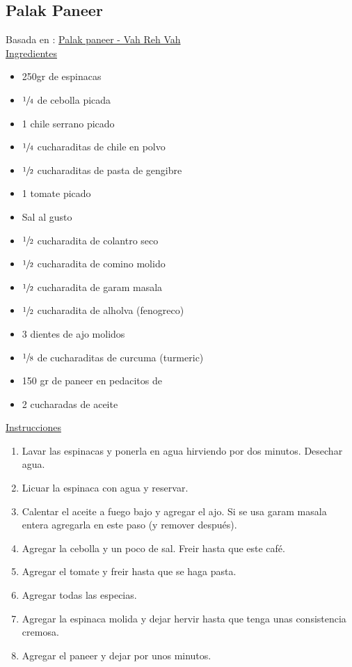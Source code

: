 \subsection{Palak Paneer}

Basada en : \href{https://www.vahrehvah.com/palak-paneer}{Palak paneer - Vah Reh Vah} \\

\underline{Ingredientes}
\begin{itemize}
\item 250gr de espinacas
\item $\sfrac{1}{4}$  de cebolla picada
\item 1 chile serrano picado
\item $\sfrac{1}{4}$ cucharaditas de chile en polvo
\item $\sfrac{1}{2}$ cucharaditas de pasta de gengibre
\item 1 tomate picado
\item Sal al gusto
\item $\sfrac{1}{2}$ cucharadita de colantro seco
\item $\sfrac{1}{2}$ cucharadita de comino molido
\item $\sfrac{1}{2}$ cucharadita de garam masala
\item $\sfrac{1}{2}$ cucharadita de alholva (fenogreco)
\item 3 dientes de ajo molidos
\item $\sfrac{1}{8}$ de cucharaditas de curcuma (turmeric)
\item 150 gr de paneer en pedacitos de \Sim 1cm
\item 2 cucharadas de aceite
\end{itemize}


\underline{Instrucciones}
\begin{enumerate}
\item Lavar las espinacas y ponerla en agua hirviendo por dos minutos. Desechar agua.
\item Licuar la espinaca con agua y reservar.
\item Calentar el aceite a fuego bajo y agregar el ajo. Si se usa garam masala entera agregarla en este paso (y remover después).
\item Agregar la cebolla y un poco de sal. Freir hasta que este café.
\item Agregar el tomate y freir hasta que se haga pasta.
\item Agregar todas las especias.
\item Agregar la espinaca molida y dejar hervir hasta que tenga unas consistencia cremosa.
\item Agregar el paneer y dejar por unos minutos.
\end{enumerate}
